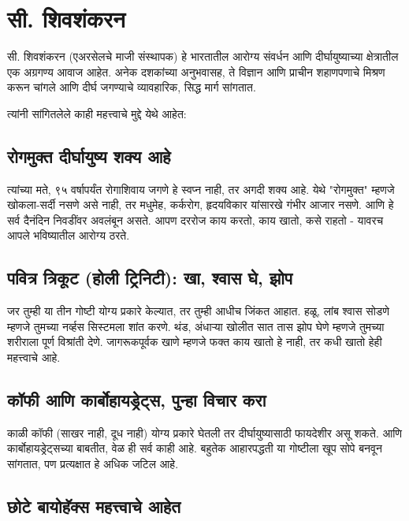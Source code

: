\chapter*{सी. शिवशंकरन}

सी. शिवशंकरन (एअरसेलचे माजी संस्थापक) हे भारतातील आरोग्य संवर्धन आणि दीर्घायुष्याच्या क्षेत्रातील एक अग्रगण्य आवाज आहेत. अनेक दशकांच्या अनुभवासह, ते विज्ञान आणि प्राचीन शहाणपणाचे मिश्रण करून चांगले आणि दीर्घ जगण्याचे व्यावहारिक, सिद्ध मार्ग सांगतात.

त्यांनी सांगितलेले काही महत्त्वाचे मुद्दे येथे आहेत:

\section*{रोगमुक्त दीर्घायुष्य शक्य आहे}

त्यांच्या मते, ९५ वर्षापर्यंत रोगाशिवाय जगणे हे स्वप्न नाही, तर अगदी शक्य आहे. येथे "रोगमुक्त" म्हणजे खोकला-सर्दी नसणे असे नाही, तर मधुमेह, कर्करोग, हृदयविकार यांसारखे गंभीर आजार नसणे. आणि हे सर्व दैनंदिन निवडींवर अवलंबून असते. आपण दररोज काय करतो, काय खातो, कसे राहतो - यावरच आपले भविष्यातील आरोग्य ठरते.

\section*{पवित्र त्रिकूट (होली ट्रिनिटी): खा, श्वास घे, झोप}

जर तुम्ही या तीन गोष्टी योग्य प्रकारे केल्यात, तर तुम्ही आधीच जिंकत आहात. हळू, लांब श्वास सोडणे म्हणजे तुमच्या नर्व्हस सिस्टमला शांत करणे. थंड, अंधाऱ्या खोलीत सात तास झोप घेणे म्हणजे तुमच्या शरीराला पूर्ण विश्रांती देणे. जागरूकपूर्वक खाणे म्हणजे फक्त काय खातो हे नाही, तर कधी खातो हेही महत्त्वाचे आहे.

\section*{कॉफी आणि कार्बोहायड्रेट्स, पुन्हा विचार करा}

काळी कॉफी (साखर नाही, दूध नाही) योग्य प्रकारे घेतली तर दीर्घायुष्यासाठी फायदेशीर असू शकते. आणि कार्बोहायड्रेट्सच्या बाबतीत, वेळ ही सर्व काही आहे. बहुतेक आहारपद्धती या गोष्टीला खूप सोपे बनवून सांगतात, पण प्रत्यक्षात हे अधिक जटिल आहे.

\section*{छोटे बायोहॅक्स महत्त्वाचे आहेत}


